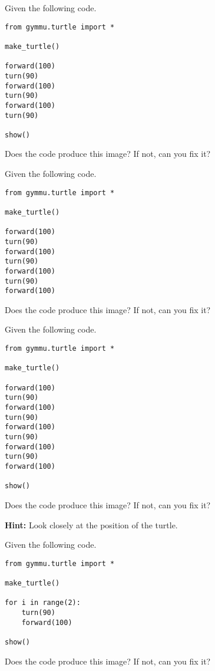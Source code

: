 \documentclass[11pt,a4paper]{report}
\begin{document}
\newpage


\begin{ex}
Given the following code.
\begin{lstlisting}
from gymmu.turtle import *

make_turtle()

forward(100)
turn(90)
forward(100)
turn(90)
forward(100)
turn(90)

show()
\end{lstlisting}
Does the code produce this image? If not, can you fix it?
\end{ex}


\newpage

\begin{ex}
Given  the following code.
\begin{lstlisting}
from gymmu.turtle import *

make_turtle()

forward(100)
turn(90)
forward(100)
turn(90)
forward(100)
turn(90)
forward(100)
\end{lstlisting}
Does the code produce this image? If not, can you fix it?
\end{ex}

\newpage

\begin{ex}
Given  the following code.
\begin{lstlisting}
from gymmu.turtle import *

make_turtle()

forward(100)
turn(90)
forward(100)
turn(90)
forward(100)
turn(90)
forward(100)
turn(90)
forward(100)

show()
\end{lstlisting}
Does the code produce this image? If not, can you fix it?

\textbf{Hint:} Look closely at the position of the turtle.
\end{ex}


\newpage

\begin{ex}
Given  the following code.
\begin{lstlisting}
from gymmu.turtle import *

make_turtle()

for i in range(2):
    turn(90)
    forward(100)

show()
\end{lstlisting}
Does the code produce this image? If not, can you fix it?
\end{ex}
\end{document}
